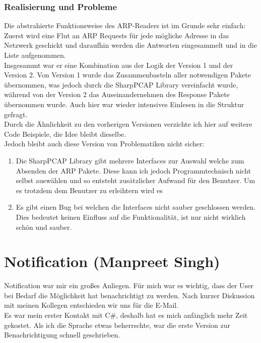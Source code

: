 \documentclass[12pt,a4paper]{report}
\begin{document}
\begin{onehalfspace}
\subsection{Realisierung und Probleme}
Die abstrahierte Funktionsweise des ARP-Readers ist im Grunde sehr einfach: Zuerst wird eine Flut an ARP Requests für jede mögliche Adresse in das Netzwerk geschickt und daraufhin werden die Antworten eingesammelt und in die Liste aufgenommen.\\
Insgesammt war er eine Kombination aus der Logik der Version 1 und der Version 2. Von Version 1 wurde das Zusammenbasteln aller notwendigen Pakete übernommen, was jedoch durch die SharpPCAP Library vereinfacht wurde, während von der Version 2 das Auseinandernehmen des Response Pakete übernommen wurde. Auch hier war wieder intensives Einlesen in die Struktur gefragt.\\
Durch die Ähnlichkeit zu den vorherigen Versionen verzichte ich hier auf weitere Code Beispiele, die Idee bleibt dieselbe.\\

Jedoch bleibt auch diese Version von Problematiken nicht sicher:\\
\begin{enumerate}
\item Die SharpPCAP Library gibt mehrere Interfaces zur Auswahl welche zum Absenden der ARP Pakete. Diese kann ich jedoch Programmtechnisch nicht selbst auswählen und so entsteht zusätzlicher Aufwand für den Benutzer. Um es trotzdem dem Benutzer zu erleihtern wird es
\item Es gibt einen Bug bei welchen die Interfaces nicht sauber geschlossen werden. Dies bedeutet keinen Einfluss auf die Funktionalität, ist nur nicht wirklich schön und sauber.
\end{enumerate}

\chapter{Notification (Manpreet Singh)}
Notification war mir ein großes Anliegen. Für mich war es wichtig, dass der User bei Bedarf die Möglichkeit hat benachrichtigt zu werden. Nach kurzer Diskussion mit meinen Kollegen entschieden wir uns für die E-Mail.\\

Es war mein erster Kontakt mit C\#, deshalb hat es mich anfänglich mehr Zeit gekostet. Als ich die Sprache etwas beherrschte, war die erste Version zur Benachrichtigung schnell geschrieben. \\


\end{onehalfspace}
\end{document}
